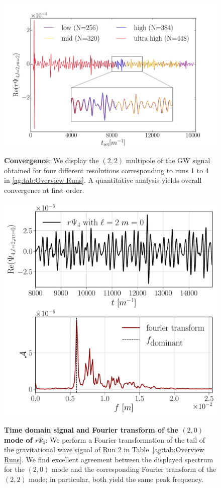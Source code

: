 \begin{figure}[h!]
\begin{center}
{\includegraphics[width=0.8\columnwidth]{ag_fig/Convergence.pdf}}
\caption{{\bf Convergence}: We display the $(2,2)$ multipole
of the GW signal obtained for four different resolutions
corresponding to runs 1 to 4 in \ref{ag:tab:Overview Runs}.
A quantitative analysis yields overall convergence at
first order.
    }
\label{ag:fig:Convergence}
\end{center}
\end{figure}



\begin{figure}[h!]
\begin{center}
{\includegraphics[width=0.7\columnwidth]{ag_fig/FFT_analysis.pdf}}
\caption{{\bf Time domain signal and
    Fourier transform of the $(2,0)$ mode
    of $r\Psi_4$}: We perform a Fourier
    transformation of the tail of the gravitational wave signal of Run 2 in Table~\ref{ag:tab:Overview Runs}.
    We find excellent agreement between the displayed
    spectrum for the $(2,0)$ mode and the corresponding Fourier transform of the $(2,2)$ mode; in particular, both yield the same peak frequency.
    }
\label{ag:fig:Fourier}
\end{center}
\end{figure}


